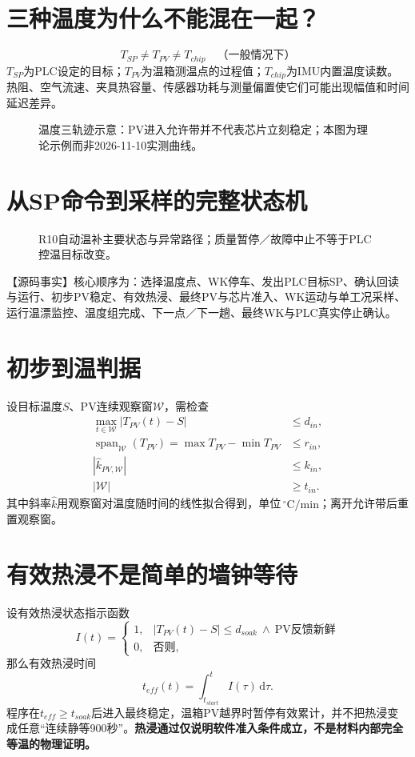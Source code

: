 \documentclass[UTF8,a4paper,11pt,oneside,openany,fontset=none]{ctexbook}
\newcommand{\dd}{\mathrm{d}}
\newcommand{\degc}{\,^{\circ}\mathrm C}
\begin{document}
\section{三种温度为什么不能混在一起？}
\begin{equation}
\boxed{T_{SP}\neq T_{PV}\neq T_{chip}\quad\text{（一般情况下）}}
\end{equation}
$T_{SP}$为PLC设定的目标；$T_{PV}$为温箱测温点的过程值；$T_{chip}$为IMU内置温度读数。热阻、空气流速、夹具热容量、传感器功耗与测量偏置使它们可能出现幅值和时间延迟差异。
\begin{figure}[htbp]\centering\caption{温度三轨迹示意：PV进入允许带并不代表芯片立刻稳定；本图为理论示例而非2026-11-10实测曲线。}\end{figure}

\section{从SP命令到采样的完整状态机}
\begin{figure}[htbp]\centering\caption{R10自动温补主要状态与异常路径；质量暂停／故障中止不等于PLC控温目标改变。}\end{figure}
【源码事实】核心顺序为：选择温度点、WK停车、发出PLC目标SP、确认回读与运行、初步PV稳定、有效热浸、最终PV与芯片准入、WK运动与单工况采样、运行温漂监控、温度组完成、下一点／下一趟、最终WK与PLC真实停止确认。

\section{初步到温判据}
设目标温度$S$、PV连续观察窗$\mathcal W$，需检查
\begin{align}
\max_{t\in\mathcal W}|T_{PV}(t)-S|&\le d_{in},\\
\operatorname{span}_{\mathcal W}(T_{PV})=\max T_{PV}-\min T_{PV}&\le r_{in},\\
|\hat k_{PV,\mathcal W}|&\le k_{in},\\
|\mathcal W|&\ge t_{in}.
\end{align}
其中斜率$\hat k$用观察窗对温度随时间的线性拟合得到，单位$\degc/\mathrm{min}$；离开允许带后重置观察窗。

\section{有效热浸不是简单的墙钟等待}
设有效热浸状态指示函数
\begin{equation}
I(t)=\begin{cases}1,&|T_{PV}(t)-S|\le d_{soak}\ \land\ \text{PV反馈新鲜}\\0,&\text{否则},\end{cases}
\end{equation}
那么有效热浸时间
\begin{equation}t_{eff}(t)=\int_{t_{start}}^t I(\tau)\,\dd\tau.
\end{equation}
程序在$t_{eff}\ge t_{soak}$后进入最终稳定，温箱PV越界时暂停有效累计，并不把热浸变成任意“连续静等900秒”。\textbf{热浸通过仅说明软件准入条件成立，不是材料内部完全等温的物理证明。}
\end{document}
